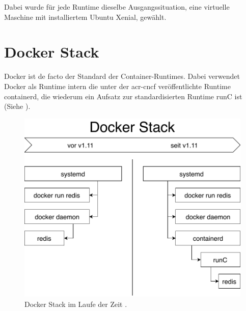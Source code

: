 Dabei wurde für jede Runtime dieselbe Ausgangssituation, eine virtuelle Maschine mit installiertem Ubuntu Xenial, gewählt.

\section{Docker Stack}
\label{sec:compDocker}
Docker ist de facto der Standard der Container-Runtimes. Dabei verwendet Docker als Runtime intern die unter der \gls{acr-cncf} veröffentlichte Runtime containerd, die wiederum ein Aufsatz zur standardisierten Runtime runC ist (Siehe ).

\begin{figure}[h]
	\begin{center}
		\includegraphics[width=\textwidth]{bilder/docker-stack-containerd-runc.pdf}
		\caption{Docker Stack im Laufe der Zeit \citep{RktVsOtherProjects}.}
		\label{fig:dockerStack}
	\end{center}
\end{figure}